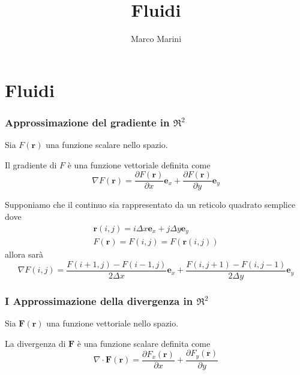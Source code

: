 \documentclass[a4paper,11pt]{article}
\title{Fluidi}
\author{Marco Marini}
\begin{document}
\maketitle
\tableofcontents

\begin{abstract}
\end{abstract}

\part{Fluidi}

\section{Approssimazione del gradiente in $ \Re^2 $}


Sia $ F(\mathbf{r}) $ una funzione scalare nello spazio.

Il gradiente di $ F $ è una funzione vettoriale definita come 
\[
  \nabla F(\mathbf{r}) =
    	\frac{\partial F(\mathbf{r})}{\partial x} \mathbf{e}_x +
    	\frac{\partial F(\mathbf{r})}{\partial y} \mathbf{e}_y   	
\]

Supponiamo che il continuo sia rappresentato da un reticolo quadrato semplice dove 
\[ 
\begin{array}{c}
  \mathbf{r}(i,j) = i \Delta x \mathbf{e}_x + j \Delta y \mathbf{e}_y
  \\
    F(\mathbf{r}) = F(i,j) = F(\mathbf{r}(i,j))
 \end{array}
\]
allora sarà
\begin{equation}
  \nabla F(i,j) =
    \frac{F(i+1,j)-F(i-1,j)}{2 \Delta x} \mathbf{e}_x +
    \frac{F(i,j+1)-F(i,j-1)}{2 \Delta y} \mathbf{e}_y
\end{equation}


\section{I Approssimazione della divergenza in $ \Re^2 $}

Sia $ \mathbf{F}(\mathbf{r}) $ una funzione vettoriale nello spazio.

La divergenza di $ \mathbf{F} $ è una funzione scalare definita come 
\[
  \nabla \cdot \mathbf{F}(\mathbf{r}) =
	\frac{\partial F_x(\mathbf{r})}{\partial x} +
	\frac{\partial F_y(\mathbf{r})}{\partial y}
\]
\end{document}
